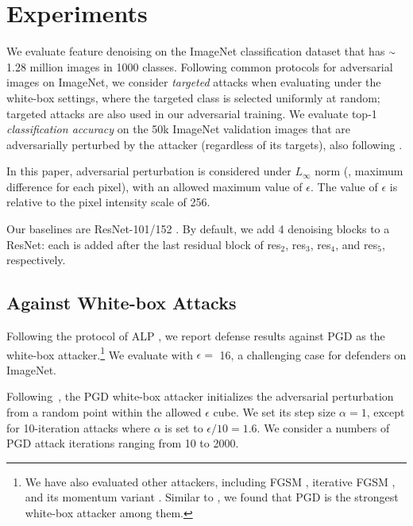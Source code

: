 \documentclass[10pt,twocolumn,letterpaper]{article}
\newcommand{\app}{\raise.17ex\hbox{$\scriptstyle\sim$}}
\begin{document}
\section{Experiments}\label{sec:experiments}

We evaluate feature denoising on the ImageNet classification dataset \cite{Russakovsky2015} that has $\app$1.28 million images in 1000 classes. Following common protocols \cite{Athalye2018,Kannan2018} for adversarial images on ImageNet, we consider \emph{targeted} attacks when evaluating under the white-box settings, where the targeted class is selected uniformly at random; 
targeted attacks are also used in our adversarial training.
We evaluate top-1 \emph{classification accuracy} on the 50k ImageNet validation images that are adversarially perturbed by the attacker (regardless of its targets), also following \cite{Athalye2018,Kannan2018}.

In this paper, adversarial perturbation is considered under $L_\infty$ norm (\ie, maximum difference for each pixel), with an allowed maximum value of $\epsilon$. The value of $\epsilon$ is relative to the pixel intensity scale of 256.

Our baselines are ResNet-101/152 \cite{He2016}.
By default, we add 4 denoising blocks to a ResNet: each is added after the last residual block of res$_2$, res$_3$, res$_4$, and res$_5$, respectively.

\subsection{Against White-box Attacks}
\label{subsec; white-box exp}

Following the protocol of ALP \cite{Kannan2018}, we report defense results against PGD as the white-box attacker.\footnote{We have also evaluated other attackers, including FGSM \cite{Goodfellow2015}, iterative FGSM \cite{Kurakin2017a}, and its momentum variant \cite{Dong2018}.
Similar to \cite{Kannan2018}, we found that PGD is the strongest white-box attacker among them.}
We evaluate with $\epsilon\!=\!$ 16, a challenging case for defenders on ImageNet.

Following~\cite{Madry2018}, the PGD white-box attacker initializes the adversarial perturbation from a random point within the allowed $\epsilon$ cube.
We set its step size $\alpha \!=\! 1$, except for 10-iteration attacks where $\alpha$ is set to $\epsilon / 10 \!=\! 1.6$.
We consider a numbers of PGD attack iterations ranging from 10 to 2000. 
\end{document}
